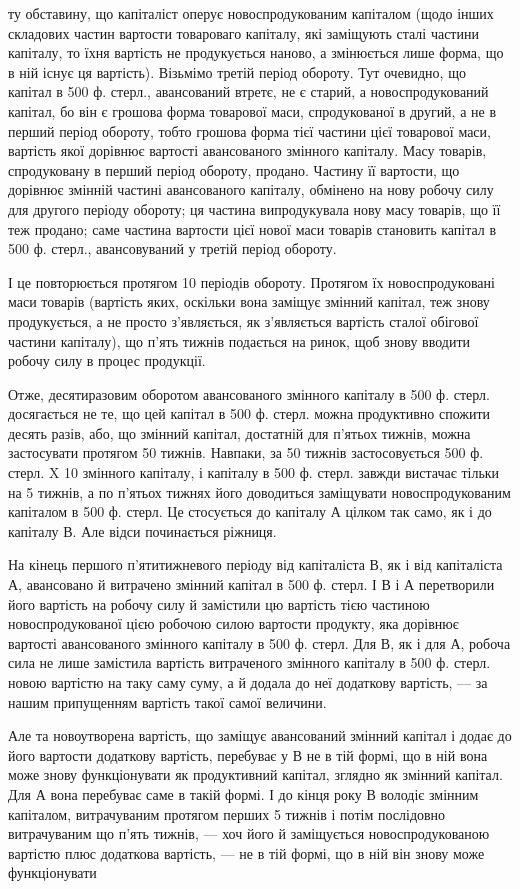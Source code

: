 \parcont{}  %
ту обставину, що капіталіст оперує новоспродукованим капіталом (щодо
інших складових частин вартости товароваго капіталу, які заміщують
сталі частини капіталу, то їхня вартість не продукується наново, а змінюється
лише форма, що в ній існує ця вартість). Візьмімо третій період
обороту. Тут очевидно, що капітал в 500 ф. стерл., авансований втретє,
не є старий, а новоспродукований капітал, бо він є грошова форма
товарової маси, спродукованої в другий, а не в перший період обороту,
тобто грошова форма тієї частини цієї товарової маси, вартість якої
дорівнює вартості авансованого змінного капіталу. Масу товарів, спродуковану
в перший період обороту, продано. Частину її вартости, що дорівнює
змінній частині авансованого капіталу, обмінено на нову робочу
силу для другого періоду обороту; ця частина випродукувала нову масу
товарів, що її теж продано; саме частина вартости цієї нової маси
товарів становить капітал в 500 ф. стерл., авансовуваний у третій період
обороту.

І це повторюється протягом 10 періодів обороту. Протягом їх новоспродуковані
маси товарів (вартість яких, оскільки вона заміщує змінний
капітал, теж знову продукується, а не просто з’являється, як з’являється
вартість сталої обігової частини капіталу), що п’ять тижнів подається
на ринок, щоб знову вводити робочу силу в процес продукції.

Отже, десятиразовим оборотом авансованого змінного капіталу в 500 ф.
стерл. досягається не те, що цей капітал в 500 ф. стерл. можна продуктивно
спожити десять разів, або, що змінний капітал, достатній для
п’ятьох тижнів, можна застосувати протягом 50 тижнів. Навпаки, за 50
тижнів застосовується 500 ф. стерл. X 10 змінного капіталу, і капіталу в
500 ф. стерл. завжди вистачає тільки на 5 тижнів, а по п’ятьох тижнях
його доводиться заміщувати новоспродукованим капіталом в 500 ф. стерл.
Це стосується до капіталу А цілком так само, як і до капіталу В. Але
відси починається ріжниця.

На кінець першого п’ятитижневого періоду від капіталіста В, як і
від капіталіста А, авансовано й витрачено змінний капітал в 500 ф. стерл.
І В і А перетворили його вартість на робочу силу й замістили цю вартість
тією частиною новоспродукованої цією робочою силою вартости продукту,
яка дорівнює вартості авансованого змінного капіталу в 500 ф. стерл. Для
В, як і для А, робоча сила не лише замістила вартість витраченого змінного
капіталу в 500 ф. стерл. новою вартістю на таку саму суму, а й додала
до неї додаткову вартість, — за нашим припущенням вартість такої
самої величини.

Але та новоутворена вартість, що заміщує авансований змінний капітал
і додає до його вартости додаткову вартість, перебуває у В не в тій
формі, що в ній вона може знову функціонувати як продуктивний капітал,
зглядно як змінний капітал. Для А вона перебуває саме в такій формі.
І до кінця року В володіє змінним капіталом, витрачуваним протягом
перших 5 тижнів і потім послідовно витрачуваним що п’ять тижнів, — хоч
його й заміщується новоспродукованою вартістю плюс додаткова вартість,
— не в тій формі, що в ній він знову може функціонувати
\parbreak{}  %
